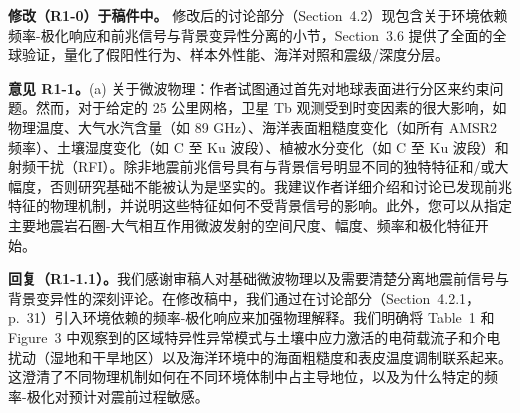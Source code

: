 \documentclass[12pt]{article}
\newcommand{\revcomment}[1]{\begingroup\color{commentcolor}#1\endgroup}
\newcommand{\revresponse}[1]{\begingroup\color{responsecolor}#1\endgroup}
\newcommand{\revchange}[1]{\begingroup\color{changecolor}#1\endgroup}
\begin{document}
\revchange{%
\textbf{修改（R1-0）于稿件中。}
修改后的讨论部分（Section~4.2）现包含关于环境依赖频率-极化响应和前兆信号与背景变异性分离的小节，Section~3.6 提供了全面的全球验证，量化了假阳性行为、样本外性能、海洋对照和震级/深度分层。
}

\bigskip

\revcomment{%
\textbf{意见 R1-1。}(a) 关于微波物理：作者试图通过首先对地球表面进行分区来约束问题。然而，对于给定的 25 公里网格，卫星 Tb 观测受到时变因素的很大影响，如物理温度、大气水汽含量（如 89 GHz）、海洋表面粗糙度变化（如所有 AMSR2 频率）、土壤湿度变化（如 C 至 Ku 波段）、植被水分变化（如 C 至 Ku 波段）和射频干扰（RFI）。除非地震前兆信号具有与背景信号明显不同的独特特征和/或大幅度，否则研究基础不能被认为是坚实的。我建议作者详细介绍和讨论已发现前兆特征的物理机制，并说明这些特征如何不受背景信号的影响。此外，您可以从指定主要地震岩石圈-大气相互作用微波发射的空间尺度、幅度、频率和极化特征开始。
}

\revresponse{%
\textbf{回复（R1-1.1）。}我们感谢审稿人对基础微波物理以及需要清楚分离地震前信号与背景变异性的深刻评论。在修改稿中，我们通过在讨论部分（Section~4.2.1，p.~31）引入环境依赖的频率-极化响应来加强物理解释。我们明确将 Table~1 和 Figure~3 中观察到的区域特异性异常模式与土壤中应力激活的电荷载流子和介电扰动（湿地和干旱地区）以及海洋环境中的海面粗糙度和表皮温度调制联系起来。这澄清了不同物理机制如何在不同环境体制中占主导地位，以及为什么特定的频率-极化对预计对震前过程敏感。
}
\end{document}
